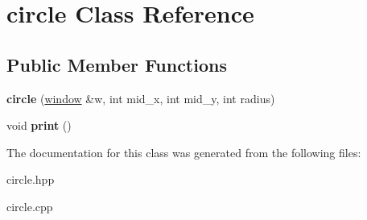 \hypertarget{classcircle}{}\section{circle Class Reference}
\label{classcircle}
\subsection*{Public Member Functions}
\begin{DoxyCompactItemize}
\item 
{\bfseries circle} (\hyperlink{classwindow}{window} \&w, int mid\+\_\+x, int mid\+\_\+y, int radius)\hypertarget{classcircle_ac6ef4a49c741dcf33e5cf5d05768b450}{}\label{classcircle_ac6ef4a49c741dcf33e5cf5d05768b450}

\item 
void {\bfseries print} ()\hypertarget{classcircle_a0c7d327e326648c249e1ba5439d1a7fa}{}\label{classcircle_a0c7d327e326648c249e1ba5439d1a7fa}

\end{DoxyCompactItemize}


The documentation for this class was generated from the following files\+:\begin{DoxyCompactItemize}
\item 
circle.\+hpp\item 
circle.\+cpp\end{DoxyCompactItemize}
